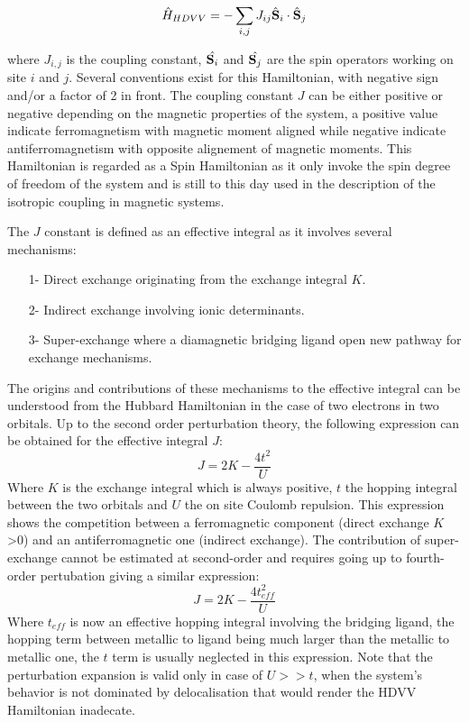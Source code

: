 \documentclass[10pt]{report}
\numberwithin{equation}{section}
\begin{document}
\begin{equation}\label{Hheis}
    \hat{H}_{HDVV}=-\sum_{i,j} J_{ij} \hat{\vb S}_i \cdot \hat{\vb S}_j
\end{equation}

where $J_{i,j}$ is the coupling constant, $\hat{\vb S_i}$ and $\hat{\vb S_j}$ are the spin operators working on site $i$ and $j$.
Several conventions exist for this Hamiltonian, with negative sign and/or a factor of 2 in front.  
The coupling constant $J$ can be either positive or negative depending on the magnetic properties of the system, a positive value indicate ferromagnetism with magnetic moment aligned while negative indicate antiferromagnetism with opposite alignement of magnetic moments.
This Hamiltonian is regarded as a Spin Hamiltonian as it only invoke the spin degree of freedom of the system and is still to this day used in the description of the isotropic coupling in magnetic systems.

The $J$ constant is defined as an effective integral as it involves several mechanisms:
\begin{itemize}
    \item[1-] Direct exchange originating from the exchange integral $K$.
    \item[2-] Indirect exchange involving ionic determinants.
    \item[3-] Super-exchange where a diamagnetic bridging ligand open new pathway for exchange mechanisms.
\end{itemize}

The origins and contributions of these mechanisms to the effective integral can be understood from the Hubbard Hamiltonian in the case of two electrons in two orbitals.
Up to the second order perturbation theory, the following expression can be obtained for the effective integral $J$:
\begin{equation}
    J=2K-\frac{4t^2}{U}
\end{equation}
Where $K$ is the exchange integral which is always positive, $t$ the hopping integral between the two orbitals and $U$ the on site Coulomb repulsion.
This expression shows the competition between a ferromagnetic component (direct exchange $K$>0) and an antiferromagnetic one (indirect exchange).
The contribution of super-exchange cannot be estimated at second-order and requires going up to fourth-order pertubation giving a similar expression:
\begin{equation}
    J=2K-\frac{4t_{eff}^2}{U}
\end{equation}
Where $t_{eff}$ is now an effective hopping integral involving the bridging ligand, the hopping term between metallic to ligand being much larger than the metallic to metallic one, the $t$ term is usually neglected in this expression.
Note that the perturbation expansion is valid only in case of $U>>t$, when the system's behavior is not dominated by delocalisation that would render the HDVV Hamiltonian inadecate.
\end{document}
